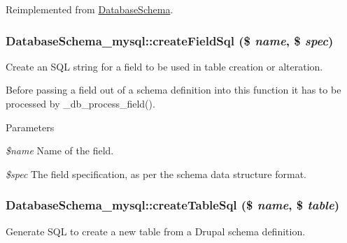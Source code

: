 Reimplemented from \hyperlink{classDatabaseSchema_ab2470d34145fdbb413dd952baf7067be}{DatabaseSchema}.\hypertarget{classDatabaseSchema__mysql_a293d3636f2bf9512c953b2706c4399d6}{
\subsubsection[{createFieldSql}]{\setlength{\rightskip}{0pt plus 5cm}DatabaseSchema\_\-mysql::createFieldSql (\$ {\em name}, \/  \$ {\em spec})}}
\label{classDatabaseSchema__mysql_a293d3636f2bf9512c953b2706c4399d6}
Create an SQL string for a field to be used in table creation or alteration.

Before passing a field out of a schema definition into this function it has to be processed by \_\-db\_\-process\_\-field().


\begin{DoxyParams}{Parameters}
\item[{\em \$name}]Name of the field. \item[{\em \$spec}]The field specification, as per the schema data structure format. \end{DoxyParams}
\hypertarget{classDatabaseSchema__mysql_a1c3bbd91d1589bd9be8a288a45636e58}{
\subsubsection[{createTableSql}]{\setlength{\rightskip}{0pt plus 5cm}DatabaseSchema\_\-mysql::createTableSql (\$ {\em name}, \/  \$ {\em table})}}
\label{classDatabaseSchema__mysql_a1c3bbd91d1589bd9be8a288a45636e58}
Generate SQL to create a new table from a Drupal schema definition.


